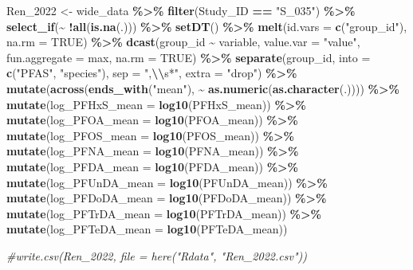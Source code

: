 \documentclass[
]{article}
\newenvironment{Shaded}{\begin{snugshade}}{\end{snugshade}}
\newcommand{\AttributeTok}[1]{\textcolor[rgb]{0.13,0.29,0.53}{#1}}
\newcommand{\CommentTok}[1]{\textcolor[rgb]{0.56,0.35,0.01}{\textit{#1}}}
\newcommand{\ConstantTok}[1]{\textcolor[rgb]{0.56,0.35,0.01}{#1}}
\newcommand{\FunctionTok}[1]{\textcolor[rgb]{0.13,0.29,0.53}{\textbf{#1}}}
\newcommand{\NormalTok}[1]{#1}
\newcommand{\OtherTok}[1]{\textcolor[rgb]{0.56,0.35,0.01}{#1}}
\newcommand{\SpecialCharTok}[1]{\textcolor[rgb]{0.81,0.36,0.00}{\textbf{#1}}}
\newcommand{\StringTok}[1]{\textcolor[rgb]{0.31,0.60,0.02}{#1}}
\begin{document}
\begin{Shaded}
\begin{Highlighting}[]
\NormalTok{Ren\_2022 }\OtherTok{\textless{}{-}}\NormalTok{ wide\_data }\SpecialCharTok{\%\textgreater{}\%} 
  \FunctionTok{filter}\NormalTok{(Study\_ID }\SpecialCharTok{==} \StringTok{"S\_035"}\NormalTok{) }\SpecialCharTok{\%\textgreater{}\%}
  \FunctionTok{select\_if}\NormalTok{(}\SpecialCharTok{\textasciitilde{}} \SpecialCharTok{!}\FunctionTok{all}\NormalTok{(}\FunctionTok{is.na}\NormalTok{(.))) }\SpecialCharTok{\%\textgreater{}\%}
  \FunctionTok{setDT}\NormalTok{() }\SpecialCharTok{\%\textgreater{}\%} 
  \FunctionTok{melt}\NormalTok{(}\AttributeTok{id.vars =} \FunctionTok{c}\NormalTok{(}\StringTok{"group\_id"}\NormalTok{), }\AttributeTok{na.rm =} \ConstantTok{TRUE}\NormalTok{) }\SpecialCharTok{\%\textgreater{}\%} 
  \FunctionTok{dcast}\NormalTok{(group\_id }\SpecialCharTok{\textasciitilde{}}\NormalTok{ variable, }\AttributeTok{value.var =} \StringTok{"value"}\NormalTok{, }\AttributeTok{fun.aggregate =}\NormalTok{ max, }\AttributeTok{na.rm =} \ConstantTok{TRUE}\NormalTok{) }\SpecialCharTok{\%\textgreater{}\%} 
  \FunctionTok{separate}\NormalTok{(group\_id, }\AttributeTok{into =} \FunctionTok{c}\NormalTok{(}\StringTok{"PFAS"}\NormalTok{, }\StringTok{"species"}\NormalTok{), }\AttributeTok{sep =} \StringTok{",}\SpecialCharTok{\textbackslash{}\textbackslash{}}\StringTok{s*"}\NormalTok{, }\AttributeTok{extra =} \StringTok{"drop"}\NormalTok{) }\SpecialCharTok{\%\textgreater{}\%} 
  \FunctionTok{mutate}\NormalTok{(}\FunctionTok{across}\NormalTok{(}\FunctionTok{ends\_with}\NormalTok{(}\StringTok{"mean"}\NormalTok{), }\SpecialCharTok{\textasciitilde{}} \FunctionTok{as.numeric}\NormalTok{(}\FunctionTok{as.character}\NormalTok{(.)))) }\SpecialCharTok{\%\textgreater{}\%}
  \FunctionTok{mutate}\NormalTok{(}\AttributeTok{log\_PFHxS\_mean =} \FunctionTok{log10}\NormalTok{(PFHxS\_mean)) }\SpecialCharTok{\%\textgreater{}\%}
  \FunctionTok{mutate}\NormalTok{(}\AttributeTok{log\_PFOA\_mean =} \FunctionTok{log10}\NormalTok{(PFOA\_mean)) }\SpecialCharTok{\%\textgreater{}\%}
  \FunctionTok{mutate}\NormalTok{(}\AttributeTok{log\_PFOS\_mean =} \FunctionTok{log10}\NormalTok{(PFOS\_mean)) }\SpecialCharTok{\%\textgreater{}\%}
  \FunctionTok{mutate}\NormalTok{(}\AttributeTok{log\_PFNA\_mean =} \FunctionTok{log10}\NormalTok{(PFNA\_mean)) }\SpecialCharTok{\%\textgreater{}\%}
  \FunctionTok{mutate}\NormalTok{(}\AttributeTok{log\_PFDA\_mean =} \FunctionTok{log10}\NormalTok{(PFDA\_mean)) }\SpecialCharTok{\%\textgreater{}\%}
  \FunctionTok{mutate}\NormalTok{(}\AttributeTok{log\_PFUnDA\_mean =} \FunctionTok{log10}\NormalTok{(PFUnDA\_mean)) }\SpecialCharTok{\%\textgreater{}\%}
  \FunctionTok{mutate}\NormalTok{(}\AttributeTok{log\_PFDoDA\_mean =} \FunctionTok{log10}\NormalTok{(PFDoDA\_mean)) }\SpecialCharTok{\%\textgreater{}\%}
  \FunctionTok{mutate}\NormalTok{(}\AttributeTok{log\_PFTrDA\_mean =} \FunctionTok{log10}\NormalTok{(PFTrDA\_mean)) }\SpecialCharTok{\%\textgreater{}\%}
  \FunctionTok{mutate}\NormalTok{(}\AttributeTok{log\_PFTeDA\_mean =} \FunctionTok{log10}\NormalTok{(PFTeDA\_mean))}

\CommentTok{\#write.csv(Ren\_2022, file = here("Rdata", "Ren\_2022.csv"))}
\end{Highlighting}
\end{Shaded}
\end{document}
